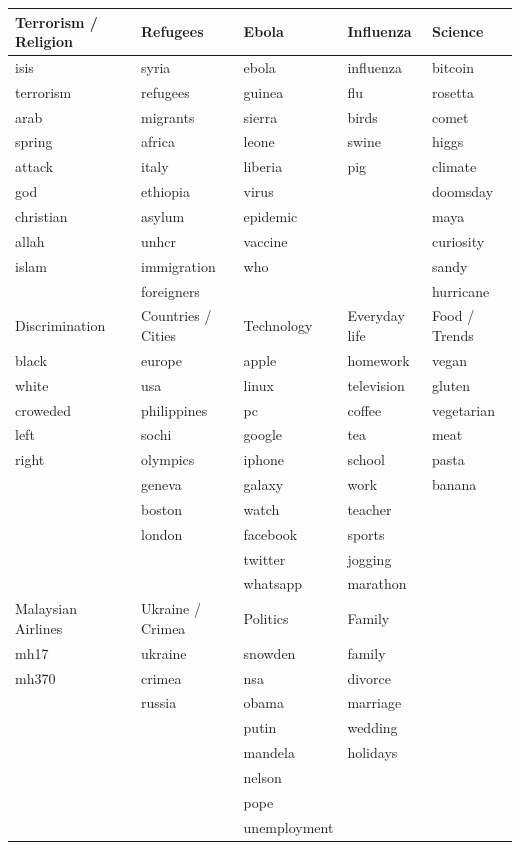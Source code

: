 \documentclass[12pt, a4paper]{article}
\begin{document}
\begin{minipage}{\linewidth}
  \centering
  \label{tab:keywords} 
  \begin{tabular}{ | l | l | l | l | l | }
    \hline
    Terrorism / Religion & Refugees & Ebola & Influenza & Science \\ \hline
    isis & syria & ebola & influenza & bitcoin \\
    terrorism & refugees & guinea & flu & rosetta \\
    arab & migrants & sierra & birds & comet \\
    spring & africa & leone & swine & higgs \\
    attack & italy & liberia & pig & climate \\
    god & ethiopia & virus &  & doomsday \\
    christian & asylum & epidemic &  & maya \\
    allah & unhcr & vaccine &  & curiosity \\
    islam & immigration & who &  & sandy \\
     & foreigners &  &  & hurricane \\ \hline \hline
     
    Discrimination & Countries / Cities & Technology & Everyday life & Food / Trends \\ \hline
    
    black & europe & apple & homework & vegan \\
    white & usa & linux & television & gluten \\
    croweded & philippines & pc & coffee & vegetarian \\
    left & sochi & google & tea & meat \\
    right & olympics & iphone & school & pasta \\
     & geneva & galaxy & work & banana \\
     & boston & watch & teacher & \\
     & london & facebook & sports & \\
     &  & twitter & jogging & \\
     &  & whatsapp &  marathon & \\ \hline \hline
     
    Malaysian Airlines & Ukraine / Crimea & Politics & Family & \\ \hline
    mh17 & ukraine & snowden & family & \\
    mh370 & crimea & nsa & divorce & \\
     & russia & obama & marriage & \\
     &  & putin & wedding & \\
     &  & mandela & holidays & \\
     &  & nelson &  & \\
     &  & pope &  & \\
     &  & unemployment &  & \\
    \hline
  \end{tabular}
\end{minipage}
\end{document}
